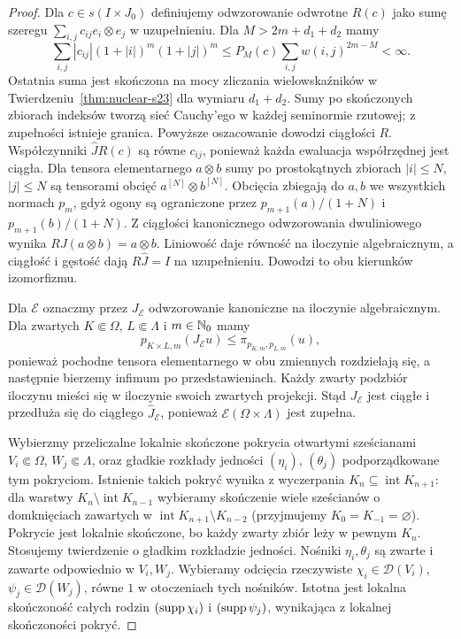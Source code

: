 \begin{proof}
Dla $c\in s(I\times J_0)$ definiujemy odwzorowanie
odwrotne $R(c)$ jako sumę szeregu
$\sum_{i,j}c_{ij}e_i\otimes e_j$ w uzupełnieniu.
Dla $M>2m+d_1+d_2$ mamy
\[
 \sum_{i,j}|c_{ij}|(1+|i|)^m(1+|j|)^m
 \le P_M(c)\sum_{i,j}w(i,j)^{2m-M}<\infty.
\]
Ostatnia suma jest skończona na mocy zliczania
wielowskaźników w Twierdzeniu~\ref{thm:nuclear-s23}
dla wymiaru $d_1+d_2$. Sumy po skończonych zbiorach
indeksów tworzą sieć Cauchy'ego w każdej seminormie
rzutowej; z zupełności istnieje granica.
Powyższe oszacowanie dowodzi ciągłości $R$.
Współczynniki $\widehat J R(c)$ są równe $c_{ij}$,
ponieważ każda ewaluacja współrzędnej jest ciągła.
Dla tensora elementarnego $a\otimes b$ sumy po
prostokątnych zbiorach $|i|\le N$, $|j|\le N$
są tensorami obcięć $a^{[N]}\otimes b^{[N]}$.
Obcięcia zbiegają do $a,b$ we wszystkich normach
$p_m$, gdyż ogony są ograniczone przez
$p_{m+1}(a)/(1+N)$ i $p_{m+1}(b)/(1+N)$.
Z ciągłości kanonicznego odwzorowania dwuliniowego
wynika $R J(a\otimes b)=a\otimes b$.
Liniowość daje równość na iloczynie algebraicznym,
a ciągłość i gęstość dają $R\widehat J=I$ na
uzupełnieniu. Dowodzi to obu kierunków izomorfizmu.

Dla $\mathcal E$ oznaczmy przez $J_{\mathcal E}$
odwzorowanie kanoniczne na iloczynie algebraicznym.
Dla zwartych $K\Subset\Omega$, $L\Subset\Lambda$
i $m\in\mathbb N_0$ mamy
\[
 p_{K\times L,m}(J_{\mathcal E}u)
 \le\pi_{p_{K,m},p_{L,m}}(u),
\]
ponieważ pochodne tensora elementarnego w obu zmiennych
rozdzielają się, a następnie bierzemy infimum
po przedstawieniach. Każdy zwarty podzbiór iloczynu
mieści się w iloczynie swoich zwartych projekcji.
Stąd $J_{\mathcal E}$ jest ciągłe i przedłuża się
do ciągłego $\widehat J_{\mathcal E}$, ponieważ
$\mathcal E(\Omega\times\Lambda)$ jest zupełna.

Wybierzmy przeliczalne lokalnie skończone pokrycia
otwartymi sześcianami $V_i\Subset\Omega$,
$W_j\Subset\Lambda$, oraz gładkie rozkłady jedności
$(\eta_i)$, $(\theta_j)$ podporządkowane tym pokryciom.
Istnienie takich pokryć wynika z wyczerpania
$K_n\subseteq\operatorname{int}K_{n+1}$:
dla warstwy $K_n\setminus\operatorname{int}K_{n-1}$
wybieramy skończenie wiele sześcianów o domknięciach
zawartych w $\operatorname{int}K_{n+1}\setminus K_{n-2}$
(przyjmujemy $K_0=K_{-1}=\varnothing$).
Pokrycie jest lokalnie skończone, bo każdy zwarty zbiór
leży w pewnym $K_n$. Stosujemy twierdzenie o gładkim
rozkładzie jedności. Nośniki $\eta_i,\theta_j$
są zwarte i zawarte odpowiednio w $V_i,W_j$.
Wybieramy odcięcia rzeczywiste
$\chi_i\in\mathcal D(V_i)$, $\psi_j\in\mathcal D(W_j)$,
równe $1$ w otoczeniach tych nośników.
Istotna jest lokalna skończoność całych rodzin
$(\operatorname{supp}\chi_i)$ i $(\operatorname{supp}\psi_j)$, wynikająca
z lokalnej skończoności pokryć.


\end{proof}
